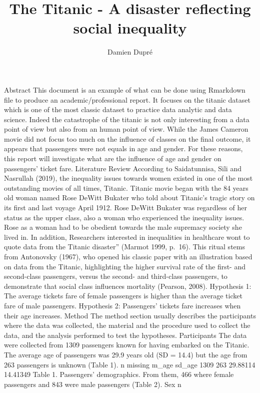 \documentclass[
]{article}
\title{The Titanic - A disaster reflecting social inequality}
\author{Damien Dupré}
\date{}
\begin{document}
\maketitle

Abstract This document is an example of what can be done using Rmarkdown
file to produce an academic/professional report. It focuses on the
titanic dataset which is one of the most classic dataset to practice
data analytic and data science. Indeed the catastrophe of the titanic is
not only interesting from a data point of view but also from an human
point of view. While the James Cameron movie did not focus too much on
the influence of classes on the final outcome, it appears that
passengers were not equals in age and gender. For these reasons, this
report will investigate what are the influence of age and gender on
passengers' ticket fare. Literature Review According to Saidatunnisa,
Sili and Nasrullah (2019), the inequality issues towards women existed
in one of the most outstanding movies of all times, Titanic. Titanic
movie began with the 84 years old woman named Rose DeWitt Bukater who
told about Titanic's tragic story on its first and last voyage April
1912. Rose DeWitt Bukater was regardless of her status as the upper
class, also a woman who experienced the inequality issues. Rose as a
woman had to be obedient towards the male supremacy society she lived
in. In addition, Researchers interested in inequalities in healthcare
wont to quote data from the Titanic disaster'' (Marmot 1999, p.~16).
This ritual stems from Antonovsky (1967), who opened his classic paper
with an illustration based on data from the Titanic, highlighting the
higher survival rate of the first- and second-class passengers, versus
the second- and third-class passengers, to demonstrate that social class
influences mortality (Pearson, 2008). Hypothesis 1: The average tickets
fare of female passengers is higher than the average ticket fare of male
passengers. Hypothesis 2: Passengers' tickets fare increases when their
age increases. Method The method section usually describes the
participants where the data was collected, the material and the
procedure used to collect the data, and the analysis performed to test
the hypotheses. Participants The data were collected from 1309
passengers known for having embarked on the Titanic. The average age of
passengers was 29.9 years old (SD = 14.4) but the age from 263
passengers is unknown (Table 1). n missing m\_age sd\_age 1309 263
29.88114 14.41349 Table 1. Passengers' demographics. From them, 466
where female passengers and 843 were male passengers (Table 2). Sex n
\end{document}
